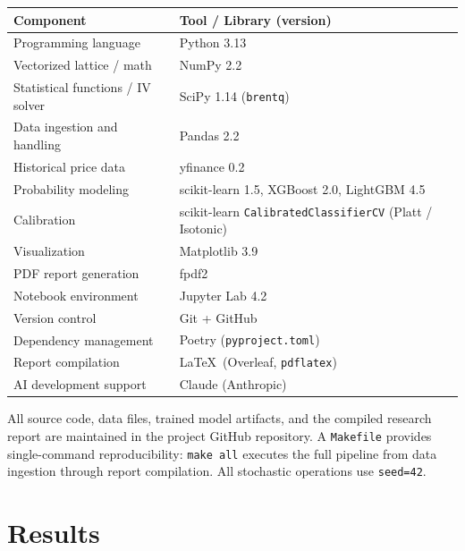 \documentclass[12pt, letterpaper]{article}
\let\oldsection\section
\renewcommand{\section}{\clearpage\oldsection}
\begin{document}
\begin{center}
\begin{tabular}{ll}
\toprule
\textbf{Component} & \textbf{Tool / Library (version)} \\
\midrule
Programming language              & Python 3.13 \\
Vectorized lattice / math         & NumPy 2.2 \\
Statistical functions / IV solver & SciPy 1.14 (\texttt{brentq}) \\
Data ingestion and handling       & Pandas 2.2 \\
Historical price data             & yfinance 0.2 \\
Probability modeling              & scikit-learn 1.5, XGBoost 2.0,
                                    LightGBM 4.5 \\
Calibration                       & scikit-learn
                                    \texttt{CalibratedClassifierCV}
                                    (Platt / Isotonic) \\
Visualization                     & Matplotlib 3.9 \\
PDF report generation             & fpdf2 \\
Notebook environment              & Jupyter Lab 4.2 \\
Version control                   & Git + GitHub \\
Dependency management             & Poetry
                                    (\texttt{pyproject.toml}) \\
Report compilation                & \LaTeX\ (Overleaf,
                                    \texttt{pdflatex}) \\
AI development support            & Claude (Anthropic) \\
\bottomrule
\end{tabular}
\end{center}

\medskip
All source code, data files, trained model artifacts, and the
compiled research report are maintained in the project GitHub
repository. A \texttt{Makefile} provides single-command
reproducibility: \texttt{make all} executes the full pipeline from
data ingestion through report compilation. All stochastic operations
use \texttt{seed=42}.

\newpage
\section{Results}
\end{document}
